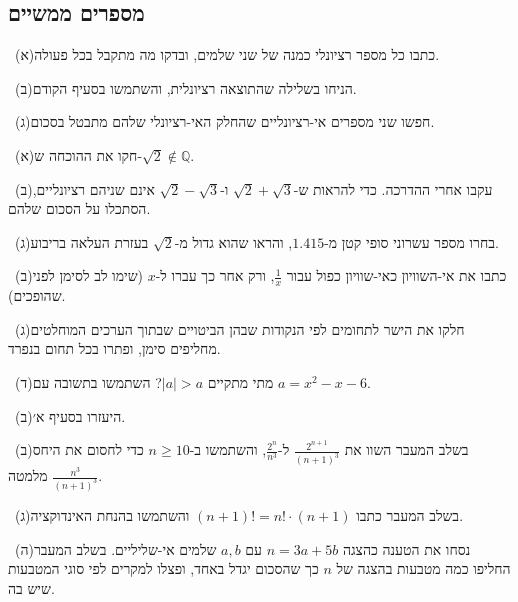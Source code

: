 \documentclass[12pt, a4paper]{article}
\begin{document}
\subsection*{מספרים ממשיים}
\noindent {}\ (א)\enskip כתבו כל מספר רציונלי כמנה של שני שלמים, ובדקו מה מתקבל בכל פעולה.\par\smallskip
\noindent {}\ (ב)\enskip הניחו בשלילה שהתוצאה רציונלית, והשתמשו בסעיף הקודם.\par\smallskip
\noindent {}\ (ג)\enskip חפשו שני מספרים אי-רציונליים שהחלק האי-רציונלי שלהם מתבטל בסכום.\par\smallskip
\noindent {}\ (א)\enskip חקו את ההוכחה ש-$\sqrt2\notin\mathbb{Q}$.\par\smallskip
\noindent {}\ (ב)\enskip עקבו אחרי ההדרכה. כדי להראות ש-$\sqrt2+\sqrt3$ ו-$\sqrt2-\sqrt3$ אינם שניהם רציונליים, הסתכלו על הסכום שלהם.\par\smallskip
\noindent {}\ (ג)\enskip בחרו מספר עשרוני סופי קטן מ-$1.415$, והראו שהוא גדול מ-$\sqrt2$ בעזרת העלאה בריבוע.\par\smallskip
\noindent {}\ (ב)\enskip כתבו את אי-השוויון כאי-שוויון כפול עבור $\frac{1}{x}$, ורק אחר כך עברו ל-$x$ (שימו לב לסימן לפני שהופכים).\par\smallskip
\noindent {}\ (ג)\enskip חלקו את הישר לתחומים לפי הנקודות שבהן הביטויים שבתוך הערכים המוחלטים מחליפים סימן, ופתרו בכל תחום בנפרד.\par\smallskip
\noindent {}\ (ד)\enskip מתי מתקיים $|a|>a$? השתמשו בתשובה עם $a=x^2-x-6$.\par\smallskip
\noindent {}\ (ב)\enskip היעזרו בסעיף א׳.\par\smallskip
\noindent {}\ (ב)\enskip בשלב המעבר השוו את $\frac{2^{n+1}}{(n+1)^3}$ ל-$\frac{2^n}{n^3}$, והשתמשו ב-$n\geq10$ כדי לחסום את היחס $\frac{n^3}{(n+1)^3}$ מלמטה.\par\smallskip
\noindent {}\ (ג)\enskip בשלב המעבר כתבו $(n+1)!=n!\cdot(n+1)$ והשתמשו בהנחת האינדוקציה.\par\smallskip
\noindent {}\ (ה)\enskip נסחו את הטענה כהצגה $n=3a+5b$ עם $a,b$ שלמים אי-שליליים. בשלב המעבר החליפו כמה מטבעות בהצגה של $n$ כך שהסכום יגדל באחד, ופצלו למקרים לפי סוגי המטבעות שיש בה.\par\smallskip
\end{document}
